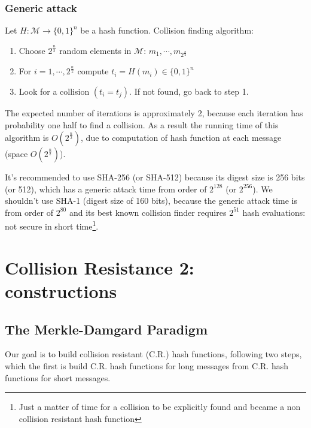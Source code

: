 \documentclass[12pt]{book}
\begin{document}
\subsubsection{Generic attack}
Let $H:\mathcal{M}\rightarrow\{0,1\}^{n}$ be a hash function. Collision finding algorithm:
\begin{enumerate}
	\item Choose $2^{\frac{n}{2}}$ random elements in $\mathcal{M}$: $m_{1},\cdots,m_{2^{\frac{n}{2}}}$
	\item For $i=1,\cdots,2^{\frac{n}{2}}$ compute $t_{i}=H(m_{i})\in\{0,1\}^{n}$
	\item Look for a collision $(t_{i}=t_{j})$. If not found, go back to step 1.
\end{enumerate}The expected number of iterations is approximately 2, because each iteration has probability one half to find a collision. As a result the running time of this algorithm is $O(2^{\frac{n}{2}})$, due to computation of hash function at each message (space $O(2^{\frac{n}{2}})$).

It's recommended to use SHA-256 (or SHA-512) because its digest size is 256 bits (or 512), which has a generic attack time from order of $2^{128}$ (or $2^{256}$). We shouldn't use SHA-1 (digest size of 160 bits), because the generic attack time is from order of $2^{80}$ and its best known collision finder requires $2^{51}$ hash evaluations: not secure in short time\footnote{Just a matter of time for a collision to be explicitly found and became a non collision resistant hash function}.

\newpage
\section{Collision Resistance 2: constructions}
\subsection{The Merkle-Damgard Paradigm}
Our goal is to build collision resistant (C.R.) hash functions, following two steps, which the first is build C.R. hash functions for long messages from C.R. hash functions for short messages.
\end{document}
